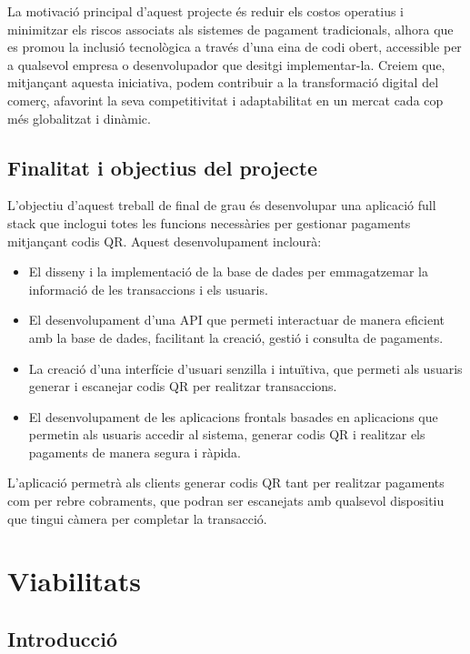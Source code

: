 \documentclass[a4paper,12pt,twoside]{ThesisStyle}
\begin{document}
La motivació principal d’aquest projecte és reduir els costos operatius i minimitzar els riscos associats als sistemes de pagament tradicionals, alhora que es promou la inclusió tecnològica a través d’una eina de codi obert, accessible per a qualsevol empresa o desenvolupador que desitgi implementar-la. Creiem que, mitjançant aquesta iniciativa, podem contribuir a la transformació digital del comerç, afavorint la seva competitivitat i adaptabilitat en un mercat cada cop més globalitzat i dinàmic.

\section{Finalitat i objectius del projecte}
\label{sec:Finalitat i objectius del projecte}

L'objectiu d'aquest treball de final de grau és desenvolupar una aplicació full stack que inclogui totes les funcions necessàries per gestionar pagaments mitjançant codis QR. Aquest desenvolupament inclourà:

\begin{itemize}
  \item El disseny i la implementació de la base de dades per emmagatzemar la informació de les transaccions i els usuaris.
  \item El desenvolupament d'una API que permeti interactuar de manera eficient amb la base de dades, facilitant la creació, gestió i consulta de pagaments.
  \item La creació d'una interfície d'usuari senzilla i intuïtiva, que permeti als usuaris generar i escanejar codis QR per realitzar transaccions.
  \item El desenvolupament de les aplicacions frontals basades en aplicacions que permetin als usuaris accedir al sistema, generar codis QR i realitzar els pagaments de manera segura i ràpida.
\end{itemize}

L'aplicació permetrà als clients generar codis QR tant per realitzar pagaments com per rebre cobraments, que podran ser escanejats amb qualsevol dispositiu que tingui càmera per completar la transacció.


\chapter{Viabilitats}
\label{chp:viabilitats}

\section{Introducció}
\label{subsec: Introducció}
\end{document}
